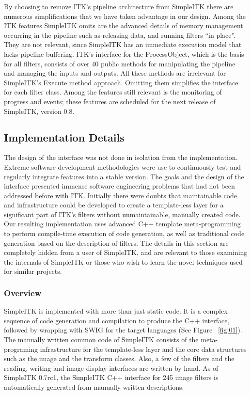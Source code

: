 \documentclass{frontiersMED} %
\begin{document}
By choosing to remove ITK’s pipeline architecture from SimpleITK there
are numerous simplifications that we have taken advantage in our
design. Among the ITK features SimpleITK omits are the advanced
details of memory management occurring in the pipeline such as
releasing data, and running filters “in place”. They are not relevant,
since SimpleITK has an immediate execution model that lacks pipeline
buffering. ITK’s interface for the ProcessObject, which is the basis
for all filters, consists of over 40 public methods for manipulating
the pipeline and managing the inputs and outputs. All these methods
are irrelevant for SimpleITK’s Execute method approach. Omitting them
simplifies the interface for each filter class.  Among the features
still relevant is the monitoring of progress and events; these
features are scheduled for the next release of SimpleITK, version 0.8.

\subsection{Implementation Details}
The design of the interface was not done in isolation from the
implementation. Extreme software development methodologies were use to
continuously test and regularly integrate features into a stable
version.  The goals and the design of the interface presented immense
software engineering problems that had not been addressed before with
ITK. Initially there were doubts that maintainable code and
infrastructure could be developed to create a template-less layer for
a significant part of ITK’s filters without unmaintainable, manually
created code. Our resulting implementation uses advanced C++ template
meta-programming to perform compile-time execution of code generation,
as well as traditional code generation based on the description of
filters. The details in this section are completely hidden from a user
of SimpleITK, and are relevant to those examining the internals of
SimpleITK or those who wish to learn the novel techniques used for
similar projects.

\subsubsection{Overview}
SimpleITK is implemented with more than just static code. It is a
complex sequence of code generation and compilation to produce the C++
interface, followed by wrapping with SWIG for the target
languages (See Figure ~\ref{fig:01}). The manually written common code of SimpleITK consists of
the meta-programing infrastructure for the template-less layer and the
core data structures such as the image and the transform
classes. Also, a few of the filters and the reading, writing and image
display interfaces are written by hand. As of SimpleITK 0.7rc1, the
SimpleITK C++ interface for 245 image filters is automatically
generated from manually written descriptions.
\end{document}

